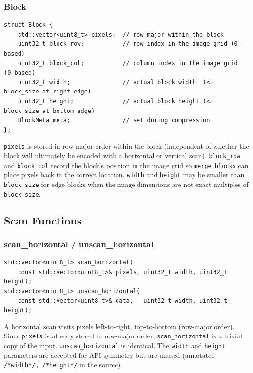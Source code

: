 \subsubsection{Block}

\begin{lstlisting}[style=cpp]
struct Block {
    std::vector<uint8_t> pixels;  // row-major within the block
    uint32_t block_row;           // row index in the image grid (0-based)
    uint32_t block_col;           // column index in the image grid (0-based)
    uint32_t width;               // actual block width  (<= block_size at right edge)
    uint32_t height;              // actual block height (<= block_size at bottom edge)
    BlockMeta meta;               // set during compression
};
\end{lstlisting}

\texttt{pixels} is stored in row-major order within the block (independent of whether
the block will ultimately be encoded with a horizontal or vertical scan).
\texttt{block\_row} and \texttt{block\_col} record the block's position in the image
grid so \texttt{merge\_blocks} can place pixels back in the correct location.
\texttt{width} and \texttt{height} may be smaller than \texttt{block\_size} for edge
blocks when the image dimensions are not exact multiples of \texttt{block\_size}.

\subsection{Scan Functions}

\subsubsection{scan\_horizontal / unscan\_horizontal}

\begin{lstlisting}[style=cpp]
std::vector<uint8_t> scan_horizontal(
    const std::vector<uint8_t>& pixels, uint32_t width, uint32_t height);
std::vector<uint8_t> unscan_horizontal(
    const std::vector<uint8_t>& data,   uint32_t width, uint32_t height);
\end{lstlisting}

A horizontal scan visits pixels left-to-right, top-to-bottom (row-major order).
Since \texttt{pixels} is already stored in row-major order, \texttt{scan\_horizontal}
is a trivial copy of the input.
\texttt{unscan\_horizontal} is identical.
The \texttt{width} and \texttt{height} parameters are accepted for API symmetry but
are unused (annotated \texttt{/{}*width*{}/, /{}*height*{}/} in the source).

